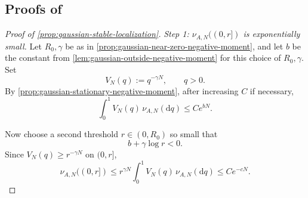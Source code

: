 \documentclass[11pt,reqno,a4paper]{article}
\begin{document}
\subsection{Proofs of
\texorpdfstring{}
{the localization and concentration results}}
\label{app:supercritical-localization-concentration}

\begin{proof}[Proof of \cref{prop:gaussian-stable-localization}]
  \emph{Step 1: $\nu_{A,N}((0,r])$ is exponentially small.}
  Let $R_0,\gamma$ be as in
  \cref{prop:gaussian-near-zero-negative-moment}, and let $b$ be the constant
  from \cref{lem:gaussian-outside-negative-moment} for this choice of
  $R_0,\gamma$. Set
  \begin{equation*}
    V_N(q):=q^{-\gamma N},
    \qquad q>0.
  \end{equation*}
  By \cref{prop:gaussian-stationary-negative-moment}, after increasing $C$ if
  necessary,
  \begin{equation}\label{eq:gaussian-lyapunov-moment-bound}
    \int_0^1 V_N(q)\,\nu_{A,N}(\mathrm{d}q)
    \leq
    C e^{bN}.
  \end{equation}

  Now choose a second threshold $r\in(0,R_0)$ so small that
  \begin{equation}\label{eq:gaussian-final-threshold-choice}
    b+\gamma\log r<0.
  \end{equation}
  Since $V_N(q)\geq r^{-\gamma N}$ on $(0,r]$,
  \begin{equation}\label{eq:gaussian-small-mass-bound}
    \nu_{A,N}((0,r])
    \leq
    r^{\gamma N}
    \int_0^1 V_N(q)\,\nu_{A,N}(\mathrm{d}q)
    \leq
    C e^{-cN}.
  \end{equation}


\end{proof}
\end{document}
